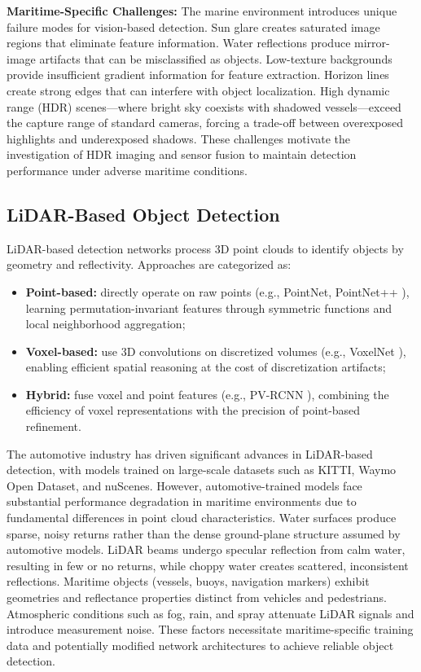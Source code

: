 \documentclass{erauthesis}
\begin{document}
\textbf{Maritime-Specific Challenges:} The marine environment introduces unique failure modes for vision-based detection. Sun glare creates saturated image regions that eliminate feature information. Water reflections produce mirror-image artifacts that can be misclassified as objects. Low-texture backgrounds provide insufficient gradient information for feature extraction. Horizon lines create strong edges that can interfere with object localization. High dynamic range (HDR) scenes—where bright sky coexists with shadowed vessels—exceed the capture range of standard cameras, forcing a trade-off between overexposed highlights and underexposed shadows. These challenges motivate the investigation of HDR imaging and sensor fusion to maintain detection performance under adverse maritime conditions.

\subsection{LiDAR-Based Object Detection}

LiDAR-based detection networks process 3D point clouds to identify objects by geometry and reflectivity. Approaches are categorized as:
\begin{itemize}
    \item \textbf{Point-based:} directly operate on raw points (e.g., PointNet, PointNet++ \cite{garcia-garcia2016}), learning permutation-invariant features through symmetric functions and local neighborhood aggregation;
    \item \textbf{Voxel-based:} use 3D convolutions on discretized volumes (e.g., VoxelNet \cite{zhou2018a}), enabling efficient spatial reasoning at the cost of discretization artifacts;
    \item \textbf{Hybrid:} fuse voxel and point features (e.g., PV-RCNN \cite{shi2021}), combining the efficiency of voxel representations with the precision of point-based refinement.
\end{itemize}

The automotive industry has driven significant advances in LiDAR-based detection, with models trained on large-scale datasets such as KITTI, Waymo Open Dataset, and nuScenes. However, automotive-trained models face substantial performance degradation in maritime environments due to fundamental differences in point cloud characteristics. Water surfaces produce sparse, noisy returns rather than the dense ground-plane structure assumed by automotive models. LiDAR beams undergo specular reflection from calm water, resulting in few or no returns, while choppy water creates scattered, inconsistent reflections. Maritime objects (vessels, buoys, navigation markers) exhibit geometries and reflectance properties distinct from vehicles and pedestrians. Atmospheric conditions such as fog, rain, and spray attenuate LiDAR signals and introduce measurement noise. These factors necessitate maritime-specific training data and potentially modified network architectures to achieve reliable object detection.
\end{document}
